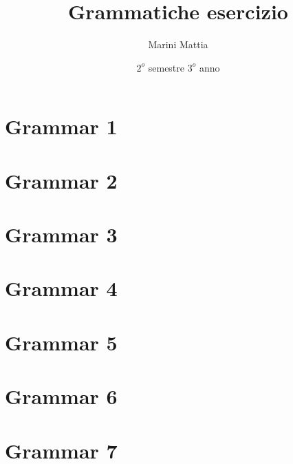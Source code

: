 \endofdump

\usetikzlibrary{external}
\tikzexternalize[prefix=tikz/]

\title{Grammatiche esercizio}
\author{Marini Mattia}
\date{$ 2^o $ semestre $ 3^o $ anno}


\maketitle

\section{Grammar 1}


\section{Grammar 2}


\section{Grammar 3}


\section{Grammar 4}


\section{Grammar 5}


\section{Grammar 6}


\section{Grammar 7}


